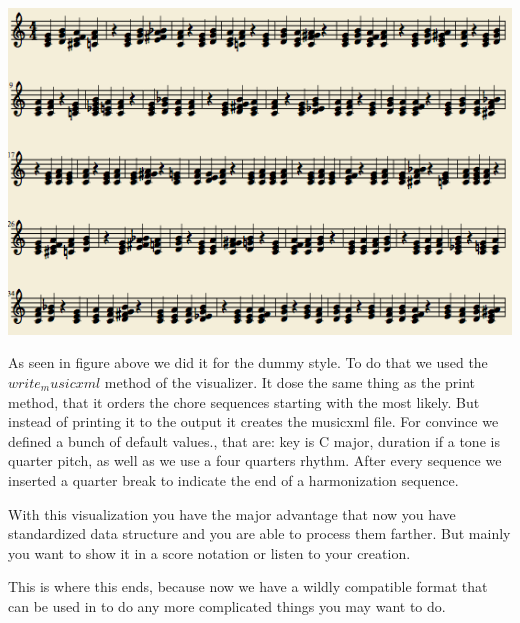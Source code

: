 \includegraphics[scale=.5]{Chapters/pic/xml_print.png}

As seen in figure above we did it for the dummy style. To do that we used the $write_musicxml$ method of the visualizer. It dose the same thing as the print method, that it orders the chore sequences starting with the most likely. But instead of printing it to the output it creates the musicxml file. For convince we defined a bunch of default values., that are: key is C major, duration if a tone is quarter pitch, as well as we use a four quarters rhythm. After every sequence we inserted a quarter break to indicate the end of a harmonization sequence.

With this visualization you have the major advantage that now you have standardized data structure and you are able to process them farther. But mainly you want to show it in a score notation or listen to your creation.

This is where this ends, because now we have a wildly compatible format that can be used in to do any more complicated things you may want to do. 
